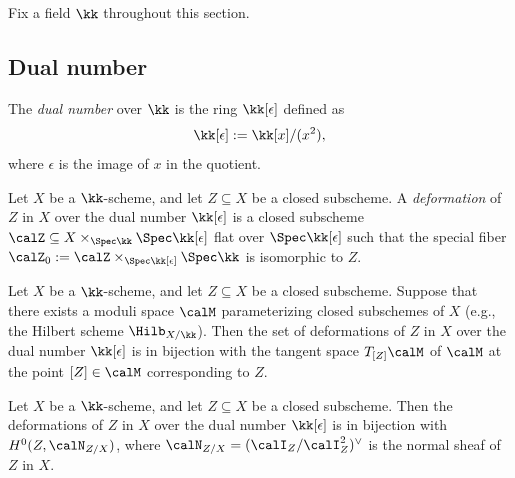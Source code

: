Fix a field \( \kk \) throughout this section.

\subsection{Dual number}

    \begin{definition}\label{def:dual_number}
        The \emph{dual number} over \( \kk \) is the ring \( \kk[\epsilon] \) defined as
        \[
            \kk[\epsilon] := \kk[x]/(x^2),
        \]
        where \( \epsilon \) is the image of \( x \) in the quotient.
    \end{definition}

    \begin{definition}\label{def:the_first_order_deformations}
        Let \( X \) be a \( \kk \)-scheme, and let \( Z \subseteq X \) be a closed subscheme. 
        A \emph{deformation} of \( Z \) in \( X \) over the dual number \( \kk[\epsilon] \) is a closed subscheme \( \calZ \subseteq X \times_{\Spec \kk} \Spec \kk[\epsilon] \) flat over \( \Spec \kk[\epsilon] \) such that the special fiber \( \calZ_0 := \calZ \times_{\Spec \kk[\epsilon]} \Spec \kk \) is isomorphic to \( Z \).
    \end{definition}


    \begin{proposition}\label{thm:the_first_order_deformations_and_tangent_space_of_moduli}
        Let \( X \) be a \( \kk \)-scheme, and let \( Z \subseteq X \) be a closed subscheme. 
        Suppose that there exists a moduli space \( \calM \) parameterizing closed subschemes of \( X \) (e.g., the Hilbert scheme \( \Hilb_{X/\kk} \)). 
        Then the set of deformations of \( Z \) in \( X \) over the dual number \( \kk[\epsilon] \) is in bijection with the tangent space \( T_{[Z]} \calM \) of \( \calM \) at the point \( [Z] \in \calM \) corresponding to \( Z \).
    \end{proposition}


    \begin{theorem}\label{thm:deformations_of_subschemes_over_dual_number}
        Let \(X\) be a \( \kk \)-scheme, and let \( Z \subseteq X \) be a closed subscheme. 
        Then the deformations of \( Z \) in \( X \) over the dual number \( \kk[\epsilon] \) is in bijection with \(H^0(Z, \calN_{Z/X})\), 
        where \( \calN_{Z/X} = (\calI_Z/\calI_Z^2)^\vee \) is the normal sheaf of \( Z \) in \( X \).
    \end{theorem}

